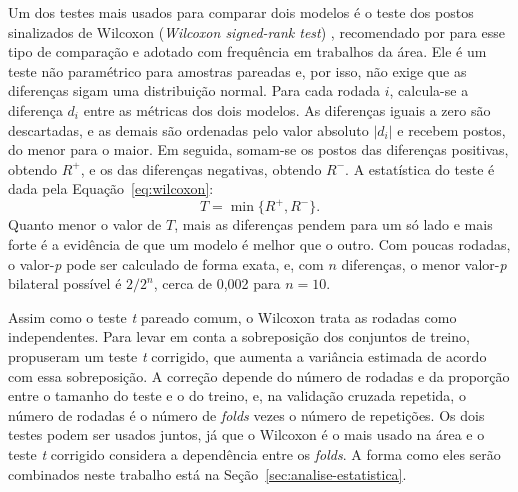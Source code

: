Um dos testes mais usados para comparar dois modelos é o teste dos postos sinalizados de Wilcoxon (\textit{Wilcoxon signed-rank test}) \cite{wilcoxon1945}, recomendado por  para esse tipo de comparação e adotado com frequência em trabalhos da área. Ele é um teste não paramétrico para amostras pareadas e, por isso, não exige que as diferenças sigam uma distribuição normal. Para cada rodada $i$, calcula-se a diferença $d_i$ entre as métricas dos dois modelos. As diferenças iguais a zero são descartadas, e as demais são ordenadas pelo valor absoluto $|d_i|$ e recebem postos, do menor para o maior. Em seguida, somam-se os postos das diferenças positivas, obtendo $R^{+}$, e os das diferenças negativas, obtendo $R^{-}$. A estatística do teste é dada pela Equação~\ref{eq:wilcoxon}:
\begin{equation}
	\label{eq:wilcoxon}
	T = \min\{R^{+}, R^{-}\}.
\end{equation}
Quanto menor o valor de $T$, mais as diferenças pendem para um só lado e mais forte é a evidência de que um modelo é melhor que o outro. Com poucas rodadas, o valor-\textit{p} pode ser calculado de forma exata, e, com $n$ diferenças, o menor valor-\textit{p} bilateral possível é $2/2^{n}$, cerca de 0,002 para $n = 10$.

Assim como o teste \textit{t} pareado comum, o Wilcoxon trata as rodadas como independentes. Para levar em conta a sobreposição dos conjuntos de treino,  propuseram um teste \textit{t} corrigido, que aumenta a variância estimada de acordo com essa sobreposição. A correção depende do número de rodadas e da proporção entre o tamanho do teste e o do treino, e, na validação cruzada repetida, o número de rodadas é o número de \textit{folds} vezes o número de repetições. Os dois testes podem ser usados juntos, já que o Wilcoxon é o mais usado na área e o teste \textit{t} corrigido considera a dependência entre os \textit{folds}. A forma como eles serão combinados neste trabalho está na Seção~\ref{sec:analise-estatistica}.

